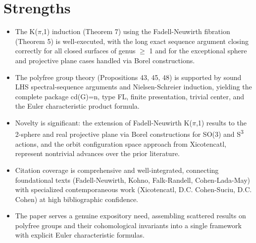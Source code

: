 \documentclass[11pt]{article}
\begin{document}
\section*{Strengths}
\begin{itemize}[leftmargin=*]
  \item The K(\ensuremath{\pi},1) induction (Theorem 7) using the Fadell-Neuwirth fibration (Theorem 5) is well-executed, with the long exact sequence argument closing correctly for all closed surfaces of genus \ensuremath{\ge} 1 and for the exceptional sphere and projective plane cases handled via Borel constructions.
  \item The polyfree group theory (Propositions 43, 45, 48) is supported by sound LHS spectral-sequence arguments and Nielsen-Schreier induction, yielding the complete package cd(G)=n, type FL, finite presentation, trivial center, and the Euler characteristic product formula.
  \item Novelty is significant: the extension of Fadell-Neuwirth K(\ensuremath{\pi},1) results to the 2-sphere and real projective plane via Borel constructions for SO(3) and S\textsuperscript{3} actions, and the orbit configuration space approach from Xicotencatl, represent nontrivial advances over the prior literature.
  \item Citation coverage is comprehensive and well-integrated, connecting foundational texts (Fadell-Neuwirth, Kohno, Falk-Randell, Cohen-Lada-May) with specialized contemporaneous work (Xicotencatl, D.C. Cohen-Suciu, D.C. Cohen) at high bibliographic confidence.
  \item The paper serves a genuine expository need, assembling scattered results on polyfree groups and their cohomological invariants into a single framework with explicit Euler characteristic formulas.
\end{itemize}
\end{document}

